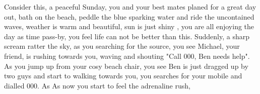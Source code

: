 Consider this, a peaceful Sunday, you and your best mates planed for a great day out, bath on the beach, peddle the blue sparking water and ride the uncontained waves, weather is warm and beautiful, sun is just shiny , you are all enjoying the day as time pass-by, you feel life can not be better than this. Suddenly, a sharp scream ratter the sky, as you searching for the source, you see Michael, your friend, is rushing towards you, waving and shouting "Call 000, Ben needs help". As you jump up from your cosy beach chair, you see Ben is just dragged up by two guys and start to walking towards you, you searches for your mobile and dialled 000. As As now you start to feel the adrenaline rush,  